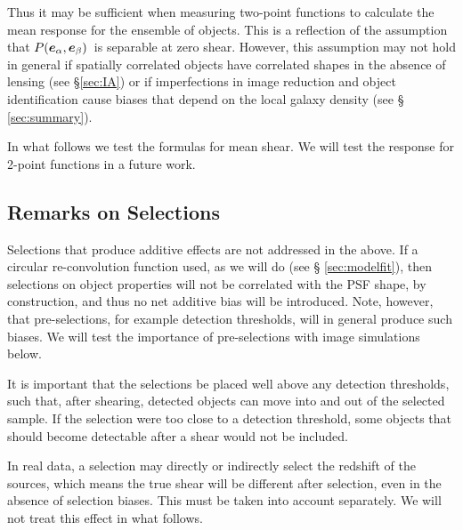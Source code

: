 \documentclass[iop]{emulateapj}
\newcommand{\vest}{\mbox{\boldmath $e$}}
\newcommand{\mcalRscalarmean}{\mbox{$\langle R \rangle$}}
\newcommand{\probe}{\mbox{$P(\vest_\alpha, \vest_\beta)$}}
\begin{document}
Thus it may be sufficient when measuring two-point functions to calculate the
mean response for the ensemble of objects.  This is a reflection of the
assumption that \probe\ is separable at zero shear.  However, this
assumption may not hold in general if spatially correlated objects have
correlated shapes in the absence of lensing (see \S \ref{sec:IA}) or if
imperfections in image reduction and object identification cause
biases that depend on the local galaxy density (see \S
\ref{sec:summary}).


In what follows we test the formulas for mean shear.  We will test the
response for 2-point functions in a future work.

\subsection{Remarks on Selections}

Selections that produce additive effects are not addressed in the above.  If a
circular re-convolution function used, as we will do (see \S
\ref{sec:modelfit}), then selections on object properties will not be
correlated with the PSF shape, by construction, and thus no net additive bias
will be introduced. Note, however, that pre-selections, for example detection
thresholds, will in general produce such biases.  We will test the importance
of pre-selections with image simulations below.


It is important that the selections be placed well above any detection
thresholds, such that, after shearing, detected objects can move into and out
of the selected sample.  If the selection were too close to a detection
threshold, some objects that should become detectable after
a shear would not be included.

In real data, a selection may directly or indirectly select the redshift of the
sources, which means the true shear will be different after selection, even in
the absence of selection biases.  This must be taken into account separately.
We will not treat this effect in what follows.
\end{document}
